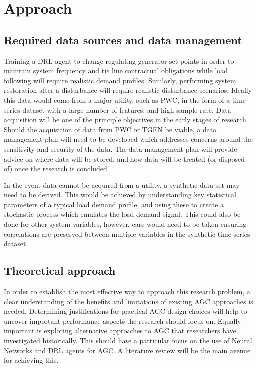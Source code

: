 \section{Approach}

\subsection{Required data sources and data management}\label{datamanagement}
Training a DRL agent to change regulating generator set points in order to maintain system frequency and tie line contractual obligations while load following will require realistic demand profiles. Similarly, performing system restoration after a disturbance will require realistic disturbance scenarios. Ideally this data would come from a major utility, such as PWC, in the form of a time series dataset with a large number of features, and high sample rate. Data acquisition will be one of the principle objectives in the early stages of research. Should the acquisition of data from PWC or TGEN be viable, a data management plan will need to be developed which addresses concerns around the sensitivity and security of the data. The data management plan will provide advice on where data will be stored, and how data will be treated (or disposed of) once the research is concluded.

In the event data cannot be acquired from a utility, a synthetic data set may need to be derived. This would be achieved by understanding key statistical parameters of a typical load demand profile, and using these to create a stochastic process which emulates the load demand signal. This could also be done for other system variables, however, care would need to be taken ensuring correlations are preserved between multiple variables in the synthetic time series dataset.

\subsection{Theoretical approach}
In order to establish the most effective way to approach this research problem, a clear understanding of the benefits and limitations of existing AGC approaches is needed. Determining justifications for practical AGC design choices will help to uncover important performance aspects the research should focus on. Equally important is exploring alternative approaches to AGC that researchers have investigated historically. This should have a particular focus on the use of Neural Networks and DRL agents for AGC. A literature review will be the main avenue for achieving this.

